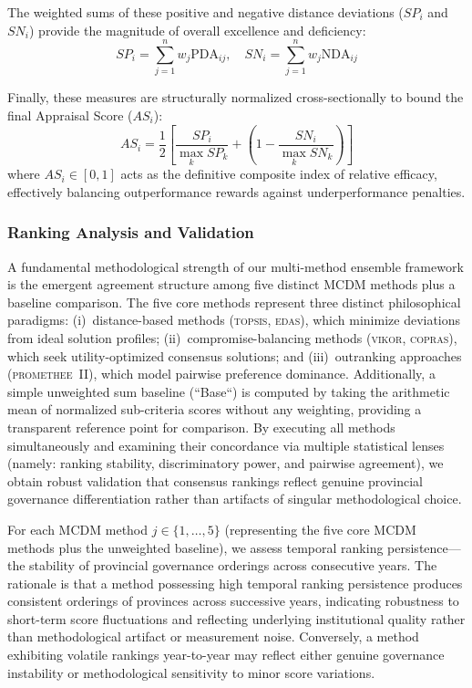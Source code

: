 \documentclass[12pt,a4paper]{article}
\newcommand{\TOPSIS}{\textsc{topsis}\xspace}
\newcommand{\VIKOR}{\textsc{vikor}\xspace}
\newcommand{\COPRAS}{\textsc{copras}\xspace}
\newcommand{\EDAS}{\textsc{edas}\xspace}
\newcommand{\PROMETHEE}{\textsc{promethee}\xspace}
\begin{document}
The weighted sums of these positive and negative distance deviations (\( SP_i \) and \( SN_i \)) provide the magnitude of overall excellence and deficiency:
\begin{equation}
    SP_i = \sum_{j=1}^{n} w_j \text{PDA}_{ij}, \quad SN_i = \sum_{j=1}^{n} w_j \text{NDA}_{ij}
\end{equation}

Finally, these measures are structurally normalized cross-sectionally to bound the final Appraisal Score (\( AS_i \)):
\begin{equation}
    AS_i = \frac{1}{2} \left[ \frac{SP_i}{\max_k SP_k} + \left( 1 - \frac{SN_i}{\max_k SN_k} \right) \right]
\end{equation}
where \( AS_i \in [0,1] \) acts as the definitive composite index of relative efficacy, effectively balancing outperformance rewards against underperformance penalties.

\subsubsection{Ranking Analysis and Validation}

A fundamental methodological strength of our multi-method ensemble framework is the emergent agreement structure among five distinct MCDM methods plus a baseline comparison. The five core methods represent three distinct philosophical paradigms: (i)~distance-based methods (\TOPSIS, \EDAS), which minimize deviations from ideal solution profiles; (ii)~compromise-balancing methods (\VIKOR, \COPRAS), which seek utility-optimized consensus solutions; and (iii)~outranking approaches (\PROMETHEE~II), which model pairwise preference dominance. Additionally, a simple unweighted sum baseline (``Base``) is computed by taking the arithmetic mean of normalized sub-criteria scores without any weighting, providing a transparent reference point for comparison. By executing all methods simultaneously and examining their concordance via multiple statistical lenses (namely: ranking stability, discriminatory power, and pairwise agreement), we obtain robust validation that consensus rankings reflect genuine provincial governance differentiation rather than artifacts of singular methodological choice.

For each MCDM method $j \in \{1, \ldots, 5\}$ (representing the five core MCDM methods plus the unweighted baseline), we assess temporal ranking persistence---the stability of provincial governance orderings across consecutive years. The rationale is that a method possessing high temporal ranking persistence produces consistent orderings of provinces across successive years, indicating robustness to short-term score fluctuations and reflecting underlying institutional quality rather than methodological artifact or measurement noise. Conversely, a method exhibiting volatile rankings year-to-year may reflect either genuine governance instability or methodological sensitivity to minor score variations.
\end{document}
